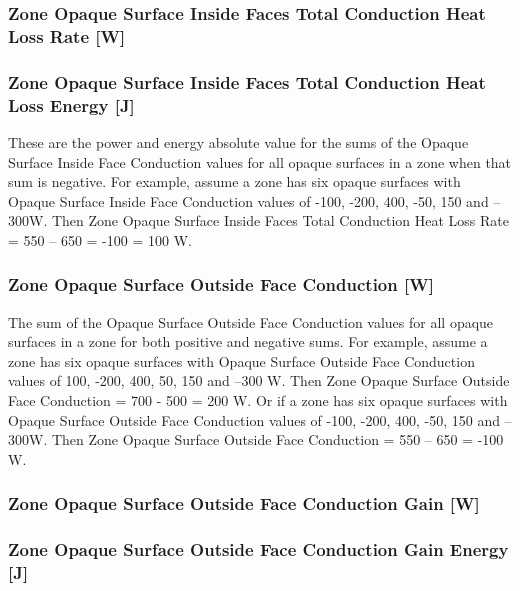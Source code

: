 \subsubsection{Zone Opaque Surface Inside Faces Total Conduction Heat Loss Rate {[}W{]}}\label{zone-opaque-surface-inside-faces-total-conduction-heat-loss-rate-w}

\subsubsection{Zone Opaque Surface Inside Faces Total Conduction Heat Loss Energy {[}J{]}}\label{zone-opaque-surface-inside-faces-total-conduction-heat-loss-energy-j}

These are the power and energy absolute value for the sums of the Opaque Surface Inside Face Conduction values for all opaque surfaces in a zone when that sum is negative. For example, assume a zone has six opaque surfaces with Opaque Surface Inside Face Conduction values of -100, -200, 400, -50, 150 and --300W. Then Zone Opaque Surface Inside Faces Total Conduction Heat Loss Rate = \textbar{}550 -- 650\textbar{} = \textbar{}-100\textbar{} = 100 W.

\subsubsection{Zone Opaque Surface Outside Face Conduction {[}W{]}}\label{zone-opaque-surface-outside-face-conduction-w}

The sum of the Opaque Surface Outside Face Conduction values for all opaque surfaces in a zone for both positive and negative sums. For example, assume a zone has six opaque surfaces with Opaque Surface Outside Face Conduction values of 100, -200, 400, 50, 150 and --300 W. Then Zone Opaque Surface Outside Face Conduction = 700 - 500 = 200 W. Or if a zone has six opaque surfaces with Opaque Surface Outside Face Conduction values of -100, -200, 400, -50, 150 and --300W. Then Zone Opaque Surface Outside Face Conduction = 550 -- 650 = -100 W.

\subsubsection{Zone Opaque Surface Outside Face Conduction Gain {[}W{]}}\label{zone-opaque-surface-outside-face-conduction-gain-w}

\subsubsection{Zone Opaque Surface Outside Face Conduction Gain Energy {[}J{]}}\label{zone-opaque-surface-outside-face-conduction-gain-energy-j}

